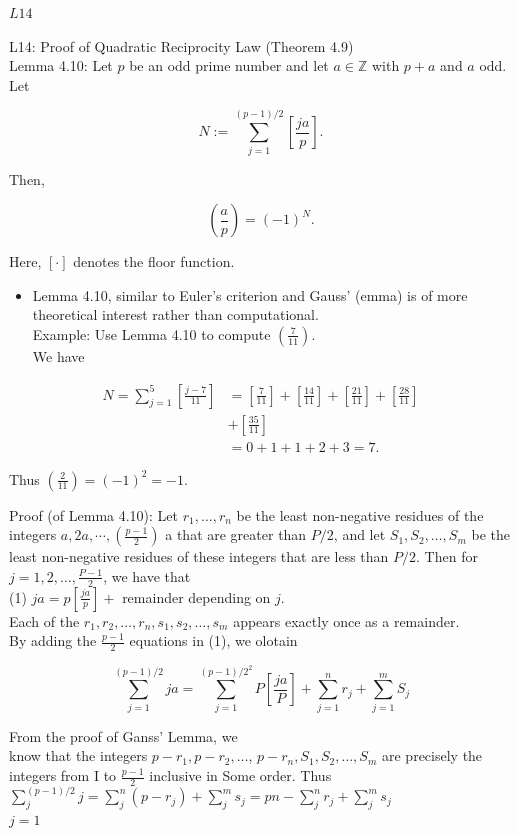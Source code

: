 \documentclass[10pt]{article}
\begin{document}
$L 14$

L14: Proof of Quadratic Reciprocity Law (Theorem 4.9)\\
Lemma 4.10: Let $p$ be an odd prime number and let $a \in \mathbb{Z}$ with $p+a$ and $a$ odd. Let

$$
N:=\sum_{j=1}^{(p-1) / 2}\left[\frac{j a}{p}\right] .
$$

Then,

$$
\left(\frac{a}{p}\right)=(-1)^{N} .
$$

Here, $[\cdot]$ denotes the floor function.

\begin{itemize}
  \item Lemma 4.10, similar to Euler's criterion and Gauss' (emma) is of more theoretical interest rather than computational.\\
Example: Use Lemma 4.10 to compute $\left(\frac{7}{11}\right)$.\\
We have
\end{itemize}

$$
\begin{aligned}
N=\sum_{j=1}^{5}\left[\frac{j-7}{11}\right] & =\left[\frac{7}{11}\right]+\left[\frac{14}{11}\right]+\left[\frac{21}{11}\right]+\left[\frac{28}{11}\right] \\
& +\left[\frac{35}{11}\right] \\
& =0+1+1+2+3=7 .
\end{aligned}
$$

Thus $\left(\frac{2}{11}\right)=(-1)^{2}=-1$.

Proof (of Lemma 4.10): Let $r_{1}, \ldots, r_{n}$ be the least non-negative residues of the integers $a, 2 a, \cdots,\left(\frac{p-1}{2}\right)$ a that are greater than $P / 2$, and let $S_{1}, S_{2}, \ldots, S_{m}$ be the least non-negative residues of these integers that are less than $P / 2$. Then for $j=1,2, \ldots, \frac{P-1}{2}$, we have that\\
(1) $j a=p\left[\frac{j a}{p}\right]+$ remainder depending on $j$.\\
Each of the $r_{1}, r_{2}, \ldots, r_{n}, s_{1}, s_{2}, \ldots, s_{m}$ appears exactly once as a remainder.\\
By adding the $\frac{p-1}{2}$ equations in (1), we olotain

$$
\sum_{j=1}^{(p-1) / 2} j a=\sum_{j=1}^{(p-1) / 2^{2}} P\left[\frac{j a}{P}\right]+\sum_{j=1}^{n} r_{j}+\sum_{j=1}^{m} S_{j}
$$

From the proof of Ganss' Lemma, we\\
know that the integers $p-r_{1}, p-r_{2}, \ldots$, $p-r_{n}, S_{1}, S_{2}, \ldots, S_{m}$ are precisely the integers from I to $\frac{p-1}{2}$ inclusive in Some order. Thus $\sum_{j}^{(p-1) / 2} j=\sum_{j}^{n}\left(p-r_{j}\right)+\sum_{j}^{m} s_{j}=p n-\sum_{j}^{n} r_{j}+\sum_{j}^{m} s_{j}$\\
$j=1$
\end{document}
